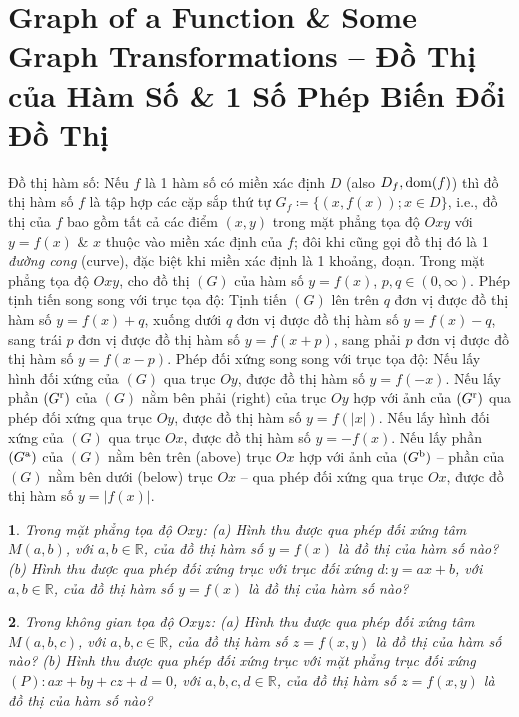 \documentclass{article}
\newtheorem{baitoan}{}
\begin{document}
\section{Graph of a Function \& Some Graph Transformations -- Đồ Thị của Hàm Số \& 1 Số Phép Biến Đổi Đồ Thị}
 {\sf Đồ thị hàm số}: Nếu $f$ là 1 hàm số có miền xác định $D$ (also $D_f,{\rm dom}(f)$) thì đồ thị hàm số $f$ là tập hợp các cặp sắp thứ tự $G_f\coloneqq\{(x,f(x));x\in D\}$, i.e., đồ thị của $f$ bao gồm tất cả các điểm $(x,y)$ trong mặt phẳng tọa độ $Oxy$ với $y = f(x)$ \& $x$ thuộc vào miền xác định của $f$; đôi khi cũng gọi đồ thị đó là 1 {\it đường cong} (curve), đặc biệt khi miền xác định là 1 khoảng, đoạn.  Trong mặt phẳng tọa độ $Oxy$, cho đồ thị $(G)$ của hàm số $y = f(x)$, $p,q\in(0,\infty)$. {\sf Phép tịnh tiến song song với trục tọa độ}: Tịnh tiến $(G)$ lên trên $q$ đơn vị được đồ thị hàm số $y = f(x) + q$, xuống dưới $q$ đơn vị được đồ thị hàm số $y = f(x) - q$, sang trái $p$ đơn vị được đồ thị hàm số $y = f(x + p)$, sang phải $p$ đơn vị được đồ thị hàm số $y = f(x - p)$. {\sf Phép đối xứng song song với trục tọa độ}: Nếu lấy hình đối xứng của $(G)$ qua trục $Oy$, được đồ thị hàm số $y = f(-x)$. Nếu lấy phần $(G^{\rm r})$ của $(G)$ nằm bên phải (right) của trục $Oy$ hợp với ảnh của $(G^{\rm r})$ qua phép đối xứng qua trục $Oy$, được đồ thị hàm số $y = f(|x|)$. Nếu lấy hình đối xứng của $(G)$ qua trục $Ox$, được đồ thị hàm số $y = -f(x)$. Nếu lấy phần $(G^{\rm a})$ của $(G)$ nằm bên trên (above) trục $Ox$ hợp với ảnh của $(G^{\rm b})$ -- phần của $(G)$ nằm bên dưới (below) trục $Ox$ -- qua phép đối xứng qua trục $Ox$, được đồ thị hàm số $y = |f(x)|$.

\begin{baitoan}
	Trong mặt phẳng tọa độ $Oxy$: (a) Hình thu được qua phép đối xứng tâm $M(a,b)$, với $a,b\in\mathbb{R}$, của đồ thị hàm số $y = f(x)$ là đồ thị của hàm số nào? (b) Hình thu được qua phép đối xứng trục với trục đối xứng $d:y = ax + b$, với $a,b\in\mathbb{R}$, của đồ thị hàm số $y = f(x)$ là đồ thị của hàm số nào?
\end{baitoan}

\begin{baitoan}
	Trong không gian tọa độ $Oxyz$: (a) Hình thu được qua phép đối xứng tâm $M(a,b,c)$, với $a,b,c\in\mathbb{R}$, của đồ thị hàm số $z = f(x,y)$ là đồ thị của hàm số nào? (b) Hình thu được qua phép đối xứng trục với mặt phẳng trục đối xứng $(P):ax + by + cz + d = 0$, với $a,b,c,d\in\mathbb{R}$, của đồ thị hàm số $z = f(x,y)$ là đồ thị của hàm số nào?
\end{baitoan}
\end{document}
